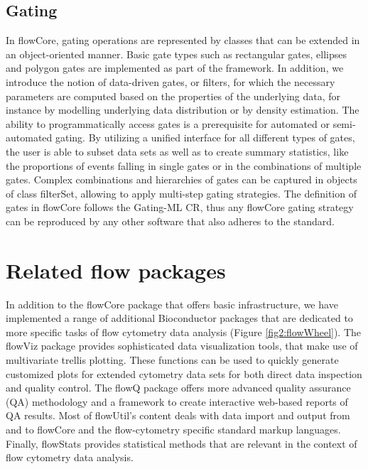 \documentclass[12pt]{article}
\begin{document}
\subsection*{Gating}
In flowCore, gating operations are represented by classes that can be
extended in an object-oriented manner. Basic gate types such as
rectangular gates, ellipses and polygon gates are implemented as part
of the framework. In addition, we introduce the notion of data-driven
gates, or filters, for which the necessary parameters are computed
based on the properties of the underlying data, for instance by
modelling underlying data distribution or by density estimation. The
ability to programmatically access gates is a prerequisite for
automated or semi-automated gating. By utilizing a unified interface
for all different types of gates, the user is able to subset data sets
as well as to create summary statistics, like the proportions of
events falling in single gates or in the combinations of multiple
gates. Complex combinations and hierarchies of gates can be captured
in objects of class filterSet, allowing to apply multi-step gating
strategies. The definition of gates in flowCore follows the Gating-ML
CR, thus any flowCore gating strategy can be reproduced by any other
software that also adheres to the standard.

\section*{Related flow packages}
In addition to the flowCore package that offers basic infrastructure,
we have implemented a range of additional Bioconductor packages that
are dedicated to more specific tasks of flow cytometry data analysis
(Figure \ref{fig2:flowWheel}). The flowViz package provides
sophisticated data visualization tools, that make use of multivariate
trellis plotting. These functions can be used to quickly generate
customized plots for extended cytometry data sets for both direct data
inspection and quality control. The flowQ package offers more advanced
quality assurance (QA) methodology and a framework to create
interactive web-based reports of QA results. Most of flowUtil's
content deals with data import and output from and to flowCore and the
flow-cytometry specific standard markup languages. Finally, flowStats
provides statistical methods that are relevant in the context of flow
cytometry data analysis.
\end{document}
